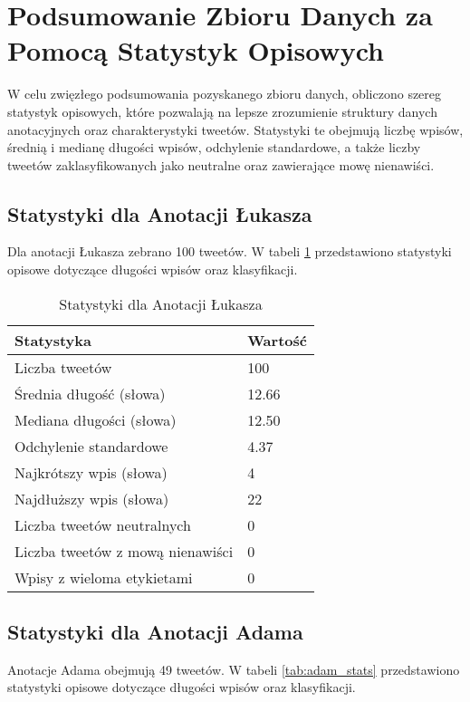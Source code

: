 \documentclass[12pt]{article}
\begin{document}
\section{Podsumowanie Zbioru Danych za Pomocą Statystyk Opisowych}

W celu zwięzłego podsumowania pozyskanego zbioru danych, obliczono szereg statystyk opisowych, które pozwalają na lepsze zrozumienie struktury danych anotacyjnych oraz charakterystyki tweetów. Statystyki te obejmują liczbę wpisów, średnią i medianę długości wpisów, odchylenie standardowe, a także liczby tweetów zaklasyfikowanych jako neutralne oraz zawierające mowę nienawiści.

\subsection{Statystyki dla Anotacji Łukasza}
Dla anotacji Łukasza zebrano 100 tweetów. W tabeli \ref{tab:lukasz_stats} przedstawiono statystyki opisowe dotyczące długości wpisów oraz klasyfikacji.

\begin{table}[h]
    \centering
    \caption{Statystyki dla Anotacji Łukasza}
    \label{tab:lukasz_stats}
    \begin{tabular}{|l|l|}
        \hline
        Statystyka & Wartość \\ \hline
        Liczba tweetów & 100 \\ \hline
        Średnia długość (słowa) & 12.66 \\ \hline
        Mediana długości (słowa) & 12.50 \\ \hline
        Odchylenie standardowe & 4.37 \\ \hline
        Najkrótszy wpis (słowa) & 4 \\ \hline
        Najdłuższy wpis (słowa) & 22 \\ \hline
        Liczba tweetów neutralnych & 0 \\ \hline
        Liczba tweetów z mową nienawiści & 0 \\ \hline
        Wpisy z wieloma etykietami & 0 \\ \hline
    \end{tabular}
\end{table}

\subsection{Statystyki dla Anotacji Adama}
Anotacje Adama obejmują 49 tweetów. W tabeli \ref{tab:adam_stats} przedstawiono statystyki opisowe dotyczące długości wpisów oraz klasyfikacji.
\end{document}
